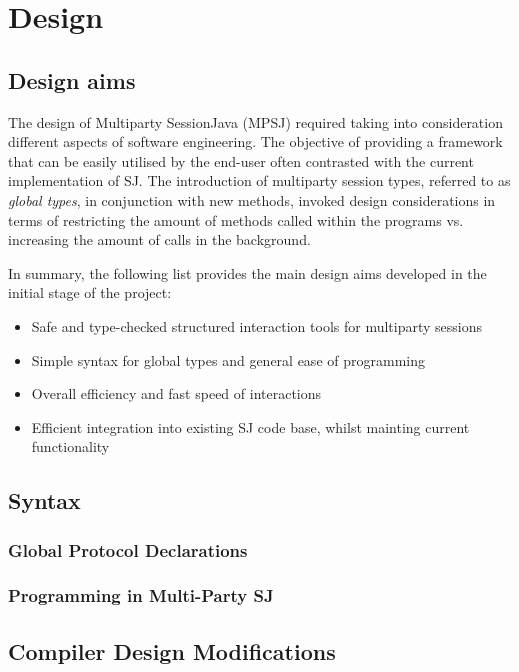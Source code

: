 \chapter{Design}
\label{ch:design}

\section{Design aims}

The design of Multiparty SessionJava (MPSJ) required taking into consideration different aspects of software engineering. The objective of providing a framework that can be easily utilised by the end-user often contrasted with the current implementation of SJ. The introduction of multiparty session types, referred to as \textit{global types}, in conjunction with new methods, invoked design considerations in terms of restricting the amount of methods called within the  programs vs. increasing the amount of calls in the background.

In summary, the following list provides the main design aims developed in the initial stage of the project:

\begin{itemize}
\item Safe and type-checked structured interaction tools for multiparty sessions
\item Simple syntax for global types and general ease of programming
\item Overall efficiency and fast speed of interactions
\item Efficient integration into existing SJ code base, whilst mainting current functionality
\end{itemize}

\section{Syntax}

\subsection{Global Protocol Declarations}

\subsection{Programming in Multi-Party SJ}



\section{Compiler Design Modifications}

